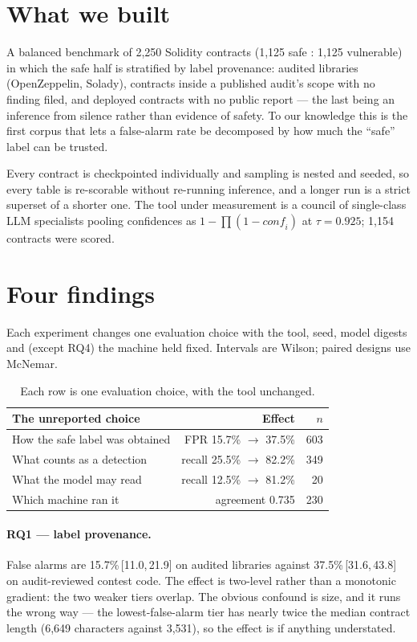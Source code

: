 \documentclass[sigconf,nonacm]{acmart}
\newcommand{\ci}[2]{\,[#1,\,#2]}
\begin{document}
\section{What we built}

A balanced benchmark of 2,250 Solidity contracts (1,125 safe : 1,125 vulnerable)
in which the safe half is stratified by label provenance: audited libraries
(OpenZeppelin, Solady), contracts inside a published audit's scope with no
finding filed, and deployed contracts with no public report --- the last being an
inference from silence rather than evidence of safety. To our knowledge this is
the first corpus that lets a false-alarm rate be decomposed by how much the
``safe'' label can be trusted.

Every contract is checkpointed individually and sampling is nested and seeded, so
every table is re-scorable without re-running inference, and a longer run is a
strict superset of a shorter one. The tool under measurement is a council of
single-class LLM specialists pooling confidences as
$1-\prod(1-\mathit{conf}_i)$ at $\tau = 0.925$; 1,154 contracts were scored.

\section{Four findings}

Each experiment changes one evaluation choice with the tool, seed, model digests
and (except RQ4) the machine held fixed. Intervals are Wilson; paired designs use
McNemar.

\begin{table}[h]
\centering
\caption{Each row is one evaluation choice, with the tool unchanged.}
\label{tab:findings}
\small
\begin{tabular}{@{}p{}rr@{}}
\toprule
\textbf{The unreported choice} & \textbf{Effect} & \textbf{$n$} \\
\midrule
How the safe label was obtained & FPR 15.7\% $\rightarrow$ 37.5\% & 603 \\
What counts as a detection & recall 25.5\% $\rightarrow$ 82.2\% & 349 \\
What the model may read & recall 12.5\% $\rightarrow$ 81.2\% & 20 \\
Which machine ran it & agreement 0.735 & 230 \\
\bottomrule
\end{tabular}
\end{table}

\paragraph{RQ1 --- label provenance.}
False alarms are 15.7\%\ci{11.0}{21.9} on audited libraries against
37.5\%\ci{31.6}{43.8} on audit-reviewed contest code. The effect is two-level
rather than a monotonic gradient: the two weaker tiers overlap. The obvious
confound is size, and it runs the wrong way --- the lowest-false-alarm tier has
nearly twice the median contract length (6,649 characters against 3,531), so the
effect is if anything understated.
\end{document}
